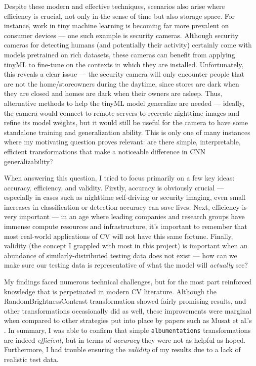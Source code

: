 \documentclass{article}
\begin{document}
Despite these modern and effective techniques, scenarios also arise where efficiency is crucial, not only in the sense of time but also storage space. For instance, work in tiny machine learning is becoming far more prevalent on consumer devices --- one such example is security cameras. Although security cameras for detecting humans (and potentially their activity) certainly come with models pretrained on rich datasets, these cameras can benefit from applying tinyML to fine-tune on the contexts in which they are installed. Unfortunately, this reveals a clear issue --- the security camera will only encounter people that are not the home/storeowners during the daytime, since stores are dark when they are closed and homes are dark when their owners are asleep. Thus, alternative methods to help the tinyML model generalize are needed --- ideally, the camera would connect to remote servers to recreate nighttime images and refine its model weights, but it would still be useful for the camera to have some standalone training and generalization ability. This is only one of many instances where my motivating question proves relevant: are there simple, interpretable, efficient transformations that make a noticeable difference in CNN generalizability?


When answering this question, I tried to focus primarily on a few key ideas: accuracy, efficiency, and validity. Firstly, accuracy is obviously crucial --- especially in cases such as nighttime self-driving or security imaging, even small increases in classification or detection accuracy can save lives. Next, efficiency is very important --- in an age where leading companies and research groups have immense compute resources and infrastructure, it's important to remember that most real-world applications of CV will not have this same fortune. Finally, validity (the concept I grappled with most in this project) is important when an abundance of similarly-distributed testing data does not exist --- how can we make sure our testing data is representative of what the model will \textit{actually} see?


My findings faced numerous technical challenges, but for the most part reinforced knowledge that is perpetuated in modern CV literature. Although the RandomBrightnessContrast transformation showed fairly promising results, and other transformations occasionally did as well, these improvements were marginal when compared to other strategies put into place by papers such as Musat et al.'s \cite{multiweather2021}. In summary, I was able to confirm that simple \texttt{albumentations} transformations are indeed \textit{efficient}, but in terms of \textit{accuracy} they were not as helpful as hoped. Furthermore, I had trouble ensuring the \textit{validity} of my results due to a lack of realistic test data.
\end{document}
